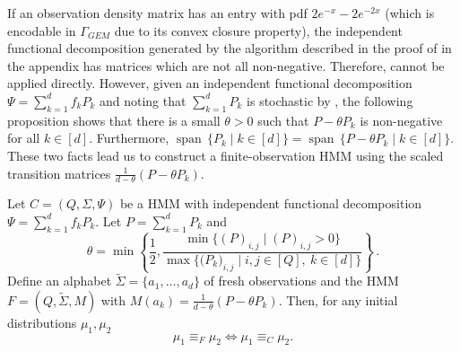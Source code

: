 \documentclass[a4paper,UKenglish,cleveref, autoref,mathscr]{lipics-v2019}
\newcommand{\1}{\mathbbm{1}}
\newcommand{\pl}{\Gamma_{\mathit{GEM}}}
\DeclareMathOperator{\Span}{span\,}
\begin{document}
If an observation density matrix has an entry with pdf $2e^{-x} - 2e^{-2x}$ (which is encodable in $\pl$ due to its convex closure property), the independent functional decomposition generated by the algorithm described in the proof of  in the appendix has matrices which are not all non-negative. Therefore,  cannot be applied directly. However, given an independent functional decomposition $\Psi = \sum_{k = 1}^d f_k P_k$ and noting that $\sum_{k = 1}^d P_k$ is stochastic by , the following proposition shows that there is a small $\theta > 0$ such that $P - \theta P_k$ is non-negative for all $k \in [d]$. Furthermore, $\Span \{P_k \mid k \in [d] \} = \Span \{ P - \theta P_k \mid k \in [d] \}$. These two facts lead us to construct a finite-observation HMM using the scaled transition matrices $\frac{1}{d - \theta} (P - \theta P_k)$.
%
\begin{proposition}\label{reductiontime}
Let $C = (Q,\Sigma,\Psi)$ be a HMM with independent functional decomposition $\Psi = \sum_{k = 1}^d f_k P_k$. Let $P = \sum_{k = 1}^d P_k$ and
\[\theta = \min \left\{ \frac12, \frac{\min \{(P)_{i,j} \mid (P)_{i,j} > 0\}}{\max \{ \big(P_k\big)_{i,j} \mid i,j \in [Q],\ k \in [d] \} } \right\}\,. \]
Define an alphabet $\tilde{\Sigma} = \{a_1, \dots, a_d\}$ of fresh observations and the HMM $F = (Q, \tilde{\Sigma}, M)$ with $M(a_k) = \frac{1}{d - \theta}(P - \theta P_k)$. Then, for any initial distributions $\mu_1, \mu_2$
\[\mu_1 \equiv_F \mu_2 \iff \mu_1 \equiv_C \mu_2.\]
\end{proposition}
\end{document}
